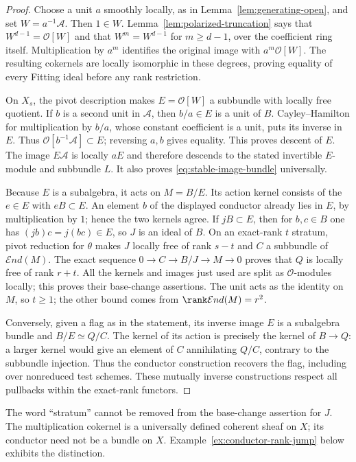 \begin{proof}
Choose a unit $a$ smoothly locally, as in
Lemma~\ref{lem:generating-open}, and set $W=a^{-1}\mathcal A$.
Then $1\in W$. Lemma~\ref{lem:polarized-truncation} says that
$W^{d-1}=\mathcal O[W]$ and that $W^m=W^{d-1}$ for $m\ge d-1$,
over the coefficient ring itself. Multiplication by $a^m$ identifies
the original image with $a^m\mathcal O[W]$. The resulting cokernels
are locally isomorphic in these degrees, proving equality of every
Fitting ideal before any rank restriction.

On $X_s$, the pivot description makes $E=\mathcal O[W]$ a subbundle
with locally free quotient. If $b$ is a second unit in $\mathcal A$,
then $b/a\in E$ is a unit of $B$. Cayley--Hamilton for multiplication
by $b/a$, whose constant coefficient is a unit, puts its inverse
in $E$. Thus $\mathcal O[b^{-1}\mathcal A]\subset E$; reversing $a,b$
gives equality. This proves descent of $E$. The image $E\mathcal A$
is locally $aE$ and therefore descends to the stated invertible
$E$-module and subbundle $L$. It also proves
\eqref{eq:stable-image-bundle} universally.

Because $E$ is a subalgebra, it acts on $M=B/E$. Its action kernel
consists of the $e\in E$ with $eB\subset E$. An element $b$ of the
displayed conductor already lies in $E$, by multiplication by $1$;
hence the two kernels agree. If $jB\subset E$, then for $b,c\in B$
one has $(jb)c=j(bc)\in E$, so $J$ is an ideal of $B$.
On an exact-rank $t$ stratum, pivot reduction for $\theta$ makes
$J$ locally free of rank $s-t$ and $C$ a subbundle of
$\mathcal E nd(M)$. The exact sequence
$0\to C\to B/J\to M\to0$ proves that $Q$ is locally free of
rank $r+t$. All the kernels and images just used are split as
$\mathcal O$-modules locally; this proves their base-change assertions.
The unit acts as the identity on $M$, so $t\ge1$; the other bound
comes from $\rank\mathcal E nd(M)=r^2$.

Conversely, given a flag as in the statement, its inverse image $E$
is a subalgebra bundle and $B/E\simeq Q/C$. The kernel of its action
is precisely the kernel of $B\to Q$: a larger kernel would give
an element of $C$ annihilating $Q/C$, contrary to the subbundle
injection. Thus the conductor construction recovers the flag,
including over nonreduced test schemes. These mutually inverse
constructions respect all pullbacks within the exact-rank functors.
\end{proof}

The word ``stratum'' cannot be removed from the base-change assertion
for $J$. The multiplication cokernel is a universally defined
coherent sheaf on $X$; its conductor need not be a bundle on $X$.
Example~\ref{ex:conductor-rank-jump} below exhibits the distinction.

